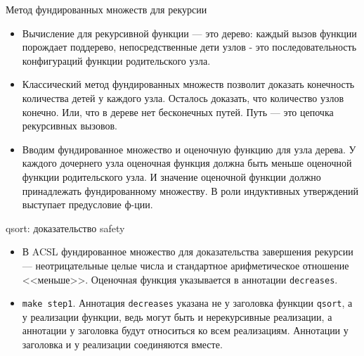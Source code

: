 \documentclass[hyperref={unicode=true}]{beamer}
\begin{document}
    \begin{frame}{Метод фундированных множеств для рекурсии}
    \begin{itemize}
    \item Вычисление для рекурсивной функции --- это дерево: каждый вызов функции порождает поддерево,
    непосредственные дети узлов - это последовательность конфигураций функции родительского узла.
    \item Классический метод фундированных множеств позволит доказать конечность количества детей у каждого узла. Осталось
    доказать, что количество узлов конечно. Или, что в дереве нет бесконечных путей. Путь --- это цепочка рекурсивных вызовов.
    \item Вводим фундированное множество и оценочную функцию для узла дерева. У каждого дочернего узла оценочная функция
    должна быть меньше оценочной функции родительского узла. И значение оценочной функции должно принадлежать
    фундированному множеству. В роли индуктивных утверждений выступает предусловие ф-ции.
    \end{itemize}
    \end{frame}

    \begin{frame}{qsort: доказательство safety}
    \begin{itemize}
    \item В ACSL фундированное множество для доказательства завершения рекурсии --- неотрицательные целые числа и
    стандартное арифметическое отношение <<меньше>>. Оценочная функция указывается в аннотации \texttt{decreases}.
    \item \texttt{make step1}. Аннотация \texttt{decreases} указана не у заголовка функции \texttt{qsort}, а у
    реализации функции, ведь могут быть и нерекурсивные реализации, а аннотации у заголовка будут относиться ко всем
    реализациям. Аннотации у заголовка и у реализации соединяются вместе.
    \end{itemize}
    \end{frame}
\end{document}
